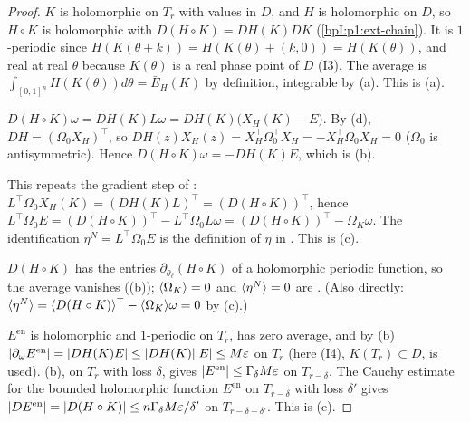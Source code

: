 \begin{proof}
\label{stepI:p1:ea-chain}
$K$ is holomorphic on $T_r$ with values in $D$, and $H$ is holomorphic on $D$, so $H\circ K$ is holomorphic with
$D(H\circ K)=DH(K)DK$ (\ref{bpI:p1:ext-chain}). It is $1$-periodic since $H(K(\theta+k))=H(K(\theta)+(k,0))=H(K(\theta))$,
and real at real $\theta$ because $K(\theta)$ is a real phase point of $D$ (I3). The average is
$\int_{[0,1]^n}H(K(\theta))d\theta=\bar E_H(K)$ by definition, integrable by (a). This is (a).

\label{stepI:p1:ea-omega}
$D(H\circ K)\omega=DH(K)L\omega=DH(K)\bigl(X_H(K)-E\bigr)$. By (d), $DH=(\Omega_0X_H)^\top$,
so $DH(z)X_H(z)=X_H^\top\Omega_0^\top X_H=-X_H^\top\Omega_0X_H=0$ ($\Omega_0$ is antisymmetric). Hence $D(H\circ K)\omega=-DH(K)E$, which is (b).

\label{stepI:p1:ea-gradient}
This repeats the gradient step of : $L^\top\Omega_0X_H(K)=(DH(K)L)^\top=(D(H\circ K))^\top$,
hence $L^\top\Omega_0E=(D(H\circ K))^\top-L^\top\Omega_0L\omega=(D(H\circ K))^\top-\Omega_K\omega$. The identification $\eta^N=L^\top\Omega_0E$ is
the definition of $\eta$ in . This is (c).

\label{stepI:p1:ea-avg}
$D(H\circ K)$ has the entries $\partial_{\theta_\ell}(H\circ K)$ of a holomorphic periodic function, so the average vanishes
((b)); $\langle \Omega_K\rangle=0$ and $\langle \eta^N\rangle=0$ are . (Also directly:
$\langle \eta^N\rangle=\langle D(H\circ K)\rangle^\top-\langle \Omega_K\rangle\omega=0$ by (c).)

\label{stepI:p1:ea-size}
$E^{\mathrm{en}}$ is holomorphic and $1$-periodic on $T_r$, has zero average, and by (b)
$\lvert \partial_\omega E^{\mathrm{en}}\rvert=\lvert DH(K)E\rvert\le\lvert DH(K)\rvert\lvert E\rvert\le M\varepsilon$ on $T_r$ (here (I4), $K(T_r)\subset D$, is used).
(b), on $T_r$ with loss $\delta$, gives $\lvert E^{\mathrm{en}}\rvert\le\Gamma_\delta M\varepsilon$ on $T_{r-\delta}$. The
Cauchy estimate  for the bounded holomorphic function $E^{\mathrm{en}}$ on $T_{r-\delta}$ with loss $\delta'$ gives
$\lvert DE^{\mathrm{en}}\rvert=\lvert D(H\circ K)\rvert\le n\Gamma_\delta M\varepsilon/\delta'$ on $T_{r-\delta-\delta'}$. This is (e).


\end{proof}
